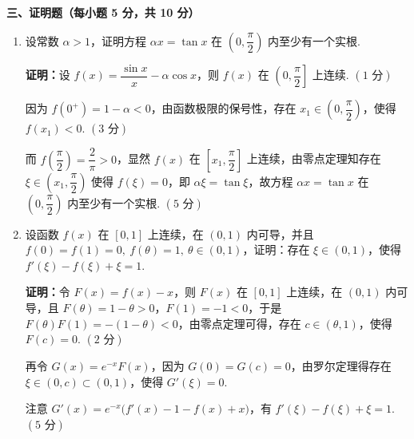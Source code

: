 \documentclass[a4paper,11pt]{ctexart}
\begin{document}
\vspace{0.8em}
\textbf{三、证明题（每小题 5 分，共 10 分）}

\begin{enumerate}[label=\arabic*., start=16, leftmargin=2em, itemsep=1.05em, topsep=0.5em]
  \item 设常数 $\alpha > 1$，证明方程 $\alpha x = \tan x$ 在 $\left(0,\dfrac{\pi}{2}\right)$ 内至少有一个实根.

  \textbf{证明：}设 $f(x) = \dfrac{\sin x}{x} - \alpha\cos x$，则 $f(x)$ 在 $\left(0,\dfrac{\pi}{2}\right]$ 上连续. \hfill $(1\text{ 分})$

  因为 $f(0^+) = 1-\alpha < 0$，由函数极限的保号性，存在 $x_1\in\left(0,\dfrac{\pi}{2}\right)$，使得 $f(x_1) < 0$. \hfill $(3\text{ 分})$

  而 $f\left(\dfrac{\pi}{2}\right) = \dfrac{2}{\pi} > 0$，显然 $f(x)$ 在 $\left[x_1,\dfrac{\pi}{2}\right]$ 上连续，由零点定理知存在 $\xi\in\left(x_1,\dfrac{\pi}{2}\right)$ 使得 $f(\xi)=0$，即 $\alpha\xi=\tan\xi$，故方程 $\alpha x=\tan x$ 在 $\left(0,\dfrac{\pi}{2}\right)$ 内至少有一个实根. \hfill $(5\text{ 分})$

  \item 设函数 $f(x)$ 在 $[0,1]$ 上连续，在 $(0,1)$ 内可导，并且 $f(0)=f(1)=0,\ f(\theta)=1,\ \theta\in(0,1)$，证明：存在 $\xi\in(0,1)$，使得 $f'(\xi)-f(\xi)+\xi=1$.

  \textbf{证明：}令 $F(x) = f(x) - x$，则 $F(x)$ 在 $[0,1]$ 上连续，在 $(0,1)$ 内可导，且 \mbox{$F(\theta) = 1-\theta > 0$}，\mbox{$F(1) = -1 < 0$}，于是 $F(\theta)F(1) = -(1-\theta) < 0$，由零点定理可得，存在 $c\in(\theta,1)$，使得 $F(c)=0$. \hfill $(2\text{ 分})$

  再令 $G(x) = e^{-x}F(x)$，因为 $G(0)=G(c)=0$，由罗尔定理得存在 $\xi\in(0,c)\subset(0,1)$，使得 $G'(\xi)=0$.

  注意 $G'(x) = e^{-x}\bigl(f'(x) - 1 - f(x) + x\bigr)$，有 $f'(\xi)-f(\xi)+\xi=1$. \hfill $(5\text{ 分})$
\end{enumerate}
\end{document}
